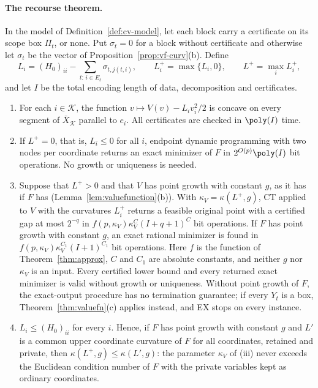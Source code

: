 \paragraph{The recourse theorem.}

\begin{theorem}\label{thm:cv}
In the model of Definition~\ref{def:cv-model}, let each block carry a
certificate on its scope box $\Pi_t$, or none. Put $\sigma_t=0$ for a block
without certificate and otherwise let $\sigma_t$ be the vector of
Proposition~\ref{prop:vf-curv}(b). Define
\begin{equation}\label{eq:cv-L}
L_i=(H_0)_{ii}-\sum_{t:\,i\in E_t}\sigma_{t,j(t,i)},\qquad
L_i^+=\max\{L_i,0\},\qquad L^+=\max_iL_i^+,
\end{equation}
and let $I$ be the total encoding length of data, decomposition and
certificates.
\begin{enumerate}
\item[(i)] For each $i\in\mathcal K$, the function $v\mapsto V(v)-L_iv_i^2/2$
is concave on every segment of $\bar X_{\mathcal K}$ parallel to $e_i$. All
certificates are checked in $\poly(I)$ time.
\item[(ii)] If $L^+=0$, that is, $L_i\le0$ for all $i$, endpoint dynamic
programming with two nodes per coordinate returns an exact minimizer of $F$
in $2^{O(p)}\poly(I)$ bit operations. No growth or uniqueness is needed.
\item[(iii)] Suppose that $L^+>0$ and that $V$ has point growth with
constant $g$, as it has if $F$ has (Lemma~\ref{lem:valuefunction}(b)).
With $\kappa_V=\kappa(L^+,g)$, CT applied to $V$ with the curvatures $L_i^+$
returns a feasible original point with a certified gap at most $2^{-q}$ in
$f(p,\kappa_V)\kappa_V^C(I+q+1)^C$ bit operations. If $F$ has point growth
with constant $g$, an exact rational minimizer is found in
$f(p,\kappa_V)\kappa_V^{C_1}(I+1)^{C_1}$ bit operations. Here $f$ is the
function of Theorem~\ref{thm:approx}, $C$ and $C_1$ are absolute constants,
and neither $g$ nor $\kappa_V$ is an input. Every certified lower bound and
every returned exact minimizer is valid without growth or uniqueness.
Without point growth of $F$, the exact-output procedure has no termination
guarantee; if every $Y_t$ is a box, Theorem~\ref{thm:valuefn}(c) applies
instead, and EX stops on every instance.
\item[(iv)] $L_i\le(H_0)_{ii}$ for every $i$. Hence, if $F$ has point
growth with constant $g$ and $L'$ is a common upper coordinate curvature of
$F$ for all coordinates, retained and private, then
$\kappa(L^+,g)\le\kappa(L',g)$: the parameter $\kappa_V$ of (iii) never
exceeds the Euclidean condition number of $F$ with the private variables
kept as ordinary coordinates.
\end{enumerate}
\end{theorem}

